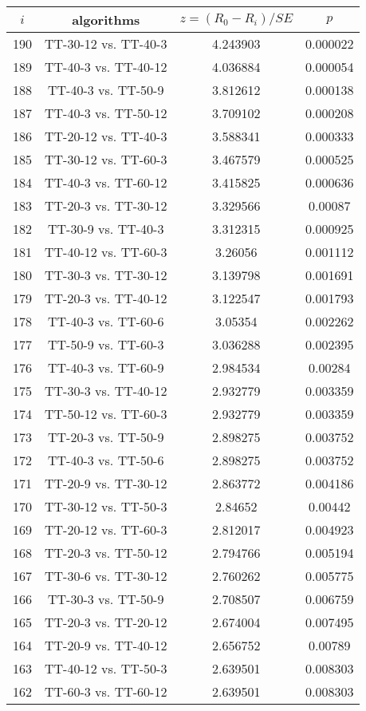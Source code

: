 \documentclass[a4paper,10pt]{article}
\begin{document}
\begin{landscape}
\begin{table}[!htp]
\centering\scriptsize
\begin{tabular}{cccc}
$i$&algorithms&$z=(R_0 - R_i)/SE$&$p$\\
\hline190&TT-30-12 vs. TT-40-3&4.243903&0.000022\\
189&TT-40-3 vs. TT-40-12&4.036884&0.000054\\
188&TT-40-3 vs. TT-50-9&3.812612&0.000138\\
187&TT-40-3 vs. TT-50-12&3.709102&0.000208\\
186&TT-20-12 vs. TT-40-3&3.588341&0.000333\\
185&TT-30-12 vs. TT-60-3&3.467579&0.000525\\
184&TT-40-3 vs. TT-60-12&3.415825&0.000636\\
183&TT-20-3 vs. TT-30-12&3.329566&0.00087\\
182&TT-30-9 vs. TT-40-3&3.312315&0.000925\\
181&TT-40-12 vs. TT-60-3&3.26056&0.001112\\
180&TT-30-3 vs. TT-30-12&3.139798&0.001691\\
179&TT-20-3 vs. TT-40-12&3.122547&0.001793\\
178&TT-40-3 vs. TT-60-6&3.05354&0.002262\\
177&TT-50-9 vs. TT-60-3&3.036288&0.002395\\
176&TT-40-3 vs. TT-60-9&2.984534&0.00284\\
175&TT-30-3 vs. TT-40-12&2.932779&0.003359\\
174&TT-50-12 vs. TT-60-3&2.932779&0.003359\\
173&TT-20-3 vs. TT-50-9&2.898275&0.003752\\
172&TT-40-3 vs. TT-50-6&2.898275&0.003752\\
171&TT-20-9 vs. TT-30-12&2.863772&0.004186\\
170&TT-30-12 vs. TT-50-3&2.84652&0.00442\\
169&TT-20-12 vs. TT-60-3&2.812017&0.004923\\
168&TT-20-3 vs. TT-50-12&2.794766&0.005194\\
167&TT-30-6 vs. TT-30-12&2.760262&0.005775\\
166&TT-30-3 vs. TT-50-9&2.708507&0.006759\\
165&TT-20-3 vs. TT-20-12&2.674004&0.007495\\
164&TT-20-9 vs. TT-40-12&2.656752&0.00789\\
163&TT-40-12 vs. TT-50-3&2.639501&0.008303\\
162&TT-60-3 vs. TT-60-12&2.639501&0.008303\\

\end{tabular}
\end{table}
\end{landscape}
\end{document}
